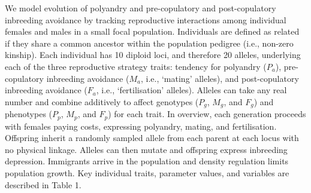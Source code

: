 \documentclass[10pt,letterpaper]{article}
\begin{document}
We model evolution of polyandry and pre-copulatory and post-copulatory inbreeding avoidance by tracking reproductive interactions among individual females and males in a small focal population. Individuals are defined as related if they share a common ancestor within the population pedigree (i.e., non-zero kinship). Each individual has 10 diploid loci, and therefore 20 alleles, underlying each of the three reproductive strategy traits: tendency for polyandry ($P_{a}$), pre-copulatory inbreeding avoidance ($M_{a}$, i.e., `mating' alleles), and post-copulatory inbreeding avoidance ($F_{a}$, i.e., `fertilisation' alleles). Alleles can take any real number \cite[i.e., a continuum-of-alleles model;][]{Kimura1965, Lande1976, Reeve2000, Bocedi2014} and combine additively to affect genotypes ($P_{g}$, $M_{g}$, and $F_{g}$) and phenotypes ($P_{p}$, $M_{p}$, and $F_{p}$) for each trait. In overview, each generation proceeds with females paying costs, expressing polyandry, mating, and fertilisation. Offspring inherit a randomly sampled allele from each parent at each locus with no physical linkage. Alleles can then mutate and offspring express inbreeding depression. Immigrants arrive in the population and density regulation limits population growth. Key individual traits, parameter values, and variables are described in Table 1.

\vspace{5 mm}
\end{document}
